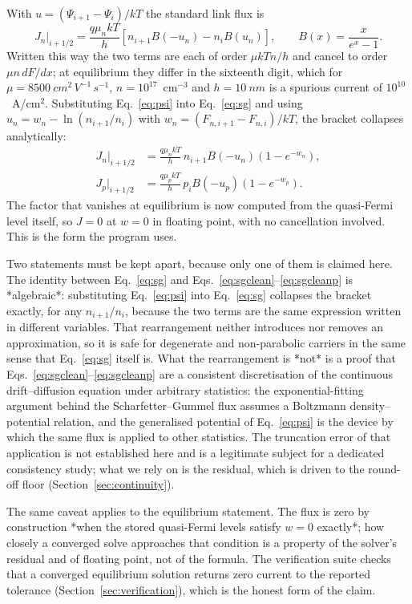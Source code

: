 \documentclass[preprint,12pt]{elsarticle}
\begin{document}
With $u=(\Psi_{i+1}-\Psi_i)/kT$ the standard link flux is
\begin{equation}
  J_n|_{i+1/2} = \frac{q\mu_n kT}{h}
  \left[n_{i+1}B(-u_n) - n_iB(u_n)\right],
  \qquad B(x)=\frac{x}{e^x-1}.
  \label{eq:sg}
\end{equation}
Written this way the two terms are each of order $\mu kT n/h$ and cancel to
order $\mu n\,dF/dx$; at equilibrium they differ in the sixteenth digit, which
for $\mu=\SI{8500}{cm^2\,V^{-1}\,s^{-1}}$, $n=10^{17}$~cm$^{-3}$ and
$h=\SI{10}{nm}$ is a
spurious current of $10^{10}$~A/cm$^2$. Substituting Eq.~\eqref{eq:psi} into
Eq.~\eqref{eq:sg} and using
$u_n=w_n-\ln(n_{i+1}/n_i)$ with $w_n=(F_{n,i+1}-F_{n,i})/kT$, the bracket
collapses analytically:
\begin{align}
  J_n|_{i+1/2} &= \frac{q\mu_n kT}{h}\,n_{i+1}B(-u_n)
  \left(1-e^{-w_n}\right),
  \label{eq:sgclean}\\
  J_p|_{i+1/2} &= \frac{q\mu_p kT}{h}\,p_iB(-u_p)
  \left(1-e^{-w_p}\right).
  \label{eq:sgcleanp}
\end{align}
The factor that vanishes at equilibrium is now computed from the quasi-Fermi
level itself, so $J=0$ at $w=0$ in floating point, with no cancellation
involved. This is the form the program uses.

Two statements must be kept apart, because only one of them is claimed here.
The identity between Eq.~\eqref{eq:sg} and
Eqs.~\eqref{eq:sgclean}--\eqref{eq:sgcleanp} is *algebraic*: substituting
Eq.~\eqref{eq:psi} into Eq.~\eqref{eq:sg} collapses the bracket exactly, for
any $n_{i+1}/n_i$, because the two terms are the same expression written in
different variables. That rearrangement neither introduces nor removes an
approximation, so it is safe for degenerate and non-parabolic carriers in the
same sense that Eq.~\eqref{eq:sg} itself is. What the rearrangement is *not*
is a proof that Eqs.~\eqref{eq:sgclean}--\eqref{eq:sgcleanp} are a consistent
discretisation of the continuous drift--diffusion equation under arbitrary
statistics: the exponential-fitting argument behind the Scharfetter--Gummel
flux assumes a Boltzmann density--potential relation, and the generalised
potential of Eq.~\eqref{eq:psi} is the device by which the same flux is
applied to other statistics. The truncation error of that application is not
established here and is a legitimate subject for a dedicated consistency
study; what we rely on is the residual, which is driven to the round-off
floor (Section~\ref{sec:continuity}).

The same caveat applies to the equilibrium statement. The flux is zero by
construction *when the stored quasi-Fermi levels satisfy $w=0$ exactly*; how
closely a converged solve approaches that condition is a property of the
solver's residual and of floating point, not of the formula. The verification
suite checks that a converged equilibrium solution returns zero current to
the reported tolerance (Section~\ref{sec:verification}), which is the honest
form of the claim.
\end{document}
